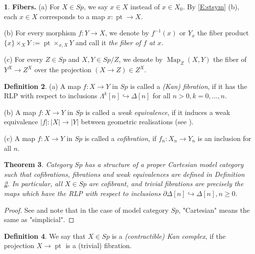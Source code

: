\documentclass[12pt]{amsart}
\theoremstyle{plain}
\newtheorem{Thm}{Theorem}[subsection]
\theoremstyle{definition}
\newtheorem{Def}[Thm]{Definition}
\newtheorem{Emp}[Thm]{}
\numberwithin{equation}{section}
\newcommand{\La}{\Lambda}
\newcommand{\hra}{\hookrightarrow}
\newcommand{\Dt}{\Delta}
\newcommand{\re}[1]{\ref{E:#1}}
\newcommand{\rd}[1]{Definition \ref{D:#1}}
\newcommand{\Map}{\operatorname{Map}}
\newcommand{\pt}{\operatorname{pt}}
\newcommand{\p}{\partial}
\begin{document}
\begin{Emp} \label{E:fibers}
{\bf Fibers.} (a) For  $X\in Sp$, we say $x\in X$ instead of $x\in
X_0$. By \re{stsym} (b), each $x\in X$ corresponds to a map
$x:\pt\to X$.

(b) For every morphism $f:Y\to X$, we denote by $f^{-1}(x)$ or
$Y_x$ the fiber product $\{x\}\times_X Y:=\pt\times_{x,X}Y$ and
call it {\em the fiber of $f$ at $x$}.

(c) For every $Z\in Sp$ and $X,Y\in Sp/Z$, we denote by
$\Map_Z(X,Y)$ the fiber of $Y^X\to Z^X$ over the
projection $(X\to Z)\in Z^X$. %

\end{Emp}

\begin{Def} \label{D:kanms}
(a) A map $f:X\to Y$ in $Sp$ is called a {\em (Kan) fibration}, if
it has the RLP with respect to inclusions $\La^k[n]\hra\Dt[n]$ for
all $n>0,k=0,\ldots,n$.

(b) A map $f:X\to Y$ in $Sp$ is called a {\em weak equivalence},
if it induces a weak equivalence $|f|:|X|\to |Y|$ between
geometric realisations (see \cite[p. 60]{GJ}).

(c)  A map $f:X\to Y$ in $Sp$ is called a {\em cofibration}, if $f_n:X_n\to Y_n$ is an inclusion 
for all $n$. 
\end{Def}

\begin{Thm} \label{T:Kan}
Category $Sp$ has a structure of a proper Cartesian model category
such that cofibrations, fibrations
and weak equivalences are defined in \rd{kanms}. In particular,
all $X\in Sp$ are cofibrant, and trivial fibrations are precisely the maps
which have the RLP with respect to inclusions
$\p\Dt[n]\hra\Dt[n],n\geq 0$.
\end{Thm}

\begin{proof}
See \cite[I, Thm 11.3, Prop 11.5 and II, Cor 8.6]{GJ} and note
that in the case of model category $Sp$, "Cartesian"  means the
same as "simplicial".
\end{proof}

\begin{Def} \label{D:kancoml}
We say that $X\in Sp$ is a {\em (contractible) Kan complex}, if
the projection $X\to\pt$ is a (trivial) fibration.
\end{Def}
\end{document}
